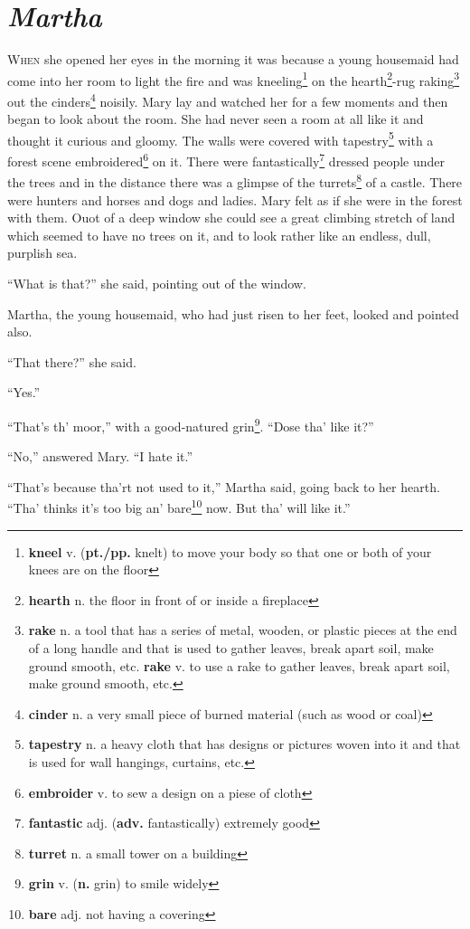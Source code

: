 \chapter{\textit{Martha}}
\lettrine{W}{hen} she opened her eyes in the morning it was because a young housemaid had come into her room to light the fire and was kneeling\footnote{\textbf{kneel} v. (\textbf{pt./pp.} knelt) to move your body so that one or both of your knees are on the floor} on the hearth\footnote{\textbf{hearth} n. the floor in front of or inside a fireplace}-rug raking\footnote{\textbf{rake} n. a tool that has a series of metal, wooden, or plastic pieces at the end of a long handle and that is used to gather leaves, break apart soil, make ground smooth, etc. \textbf{rake} v. to use a rake to gather leaves, break apart soil, make ground smooth, etc.} out the cinders\footnote{\textbf{cinder} n. a very small piece of burned material (such as wood or coal)} noisily. Mary lay and watched her for a few moments and then began to look about the room. She had never seen a room at all like it and thought it curious and gloomy. The walls were covered with tapestry\footnote{\textbf{tapestry} n. a heavy cloth that has designs or pictures woven into it and that is used for wall hangings, curtains, etc.} with a forest scene embroidered\footnote{\textbf{embroider} v. to sew a design on a piese of cloth} on it. There were fantastically\footnote{\textbf{fantastic} adj. (\textbf{adv.} fantastically) extremely good} dressed people under the trees and in the distance there was a glimpse of the turrets\footnote{\textbf{turret} n. a small tower on a building} of a castle. There were hunters and horses and dogs and ladies. Mary felt as if she were in the forest with them. Ouot of a deep window she could see a great climbing stretch of land which seemed to have no trees on it, and to look rather like an endless, dull, purplish sea.

``What is that?'' she said, pointing out of the window.

Martha, the young housemaid, who had just risen to her feet, looked and pointed also.

``That there?'' she said.

``Yes.''

``That's th' moor,'' with a good-natured grin\footnote{\textbf{grin} v. (\textbf{n.} grin) to smile widely}. ``Dose tha' like it?''

``No,'' answered Mary. ``I hate it.''

``That's because tha'rt not used to it,'' Martha said, going back to her hearth. ``Tha' thinks it's too big an' bare\footnote{\textbf{bare} adj. not having a covering} now. But tha' will like it.''

